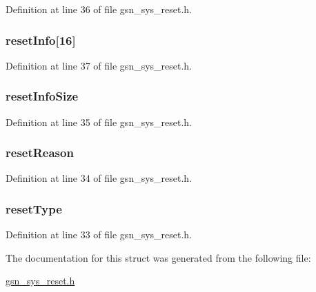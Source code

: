Definition at line 36 of file gsn\_\-sys\_\-reset.h.

\hypertarget{a00258_ab5521c89f8f524c9a3e9fa8e6591b9f8}{
\subsubsection[{resetInfo}]{ {\bf resetInfo}\mbox{[}16\mbox{]}}}
\label{a00258_ab5521c89f8f524c9a3e9fa8e6591b9f8}


Definition at line 37 of file gsn\_\-sys\_\-reset.h.

\hypertarget{a00258_af784980100bfb4e57308fee9850b394b}{
\subsubsection[{resetInfoSize}]{ {\bf resetInfoSize}}}
\label{a00258_af784980100bfb4e57308fee9850b394b}


Definition at line 35 of file gsn\_\-sys\_\-reset.h.

\hypertarget{a00258_a860e10ca47301c26f0cc214d9aaa74b9}{
\subsubsection[{resetReason}]{ {\bf resetReason}}}
\label{a00258_a860e10ca47301c26f0cc214d9aaa74b9}


Definition at line 34 of file gsn\_\-sys\_\-reset.h.

\hypertarget{a00258_a424379d8fb70c92b5ebe7450172ed356}{
\subsubsection[{resetType}]{ {\bf resetType}}}
\label{a00258_a424379d8fb70c92b5ebe7450172ed356}


Definition at line 33 of file gsn\_\-sys\_\-reset.h.



The documentation for this struct was generated from the following file:\begin{DoxyCompactItemize}
\item 
\hyperlink{a00594}{gsn\_\-sys\_\-reset.h}\end{DoxyCompactItemize}
